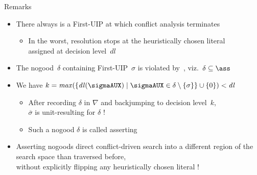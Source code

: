 \begin{frame}{Remarks}
\begin{itemize}
\item
There always is a First-UIP at which conflict analysis terminates
\begin{itemize}
\item
In the worst, resolution stops at the
heuristically chosen literal\\ assigned at decision level~$\mathit{dl}$
\end{itemize}
\pause
\item
The nogood~$\delta$ containing First-UIP~$\sigma$ is violated by~\ass,
viz.\ $\delta\subseteq\ass$
\item
We have $k=\mathit{max}(\{\mathit{dl}(\sigmaAUX)\mid\sigmaAUX\in\delta\setminus\{\sigma\}\}\cup\{0\})<\mathit{dl}$
\pause
  \begin{itemize}
  \item
  After recording $\delta$ in $\nabla$ and backjumping to decision level~$k$,\\
  $\overline{\sigma}$ is unit-resulting for $\delta$ !
  \item
  Such a nogood $\delta$ is called \alert{asserting}
  \end{itemize}
\pause
\item
Asserting nogoods direct conflict-driven search into a different
region of the search space than traversed before,\\
without explicitly flipping any heuristically chosen literal !
\end{itemize}
\end{frame}
%
